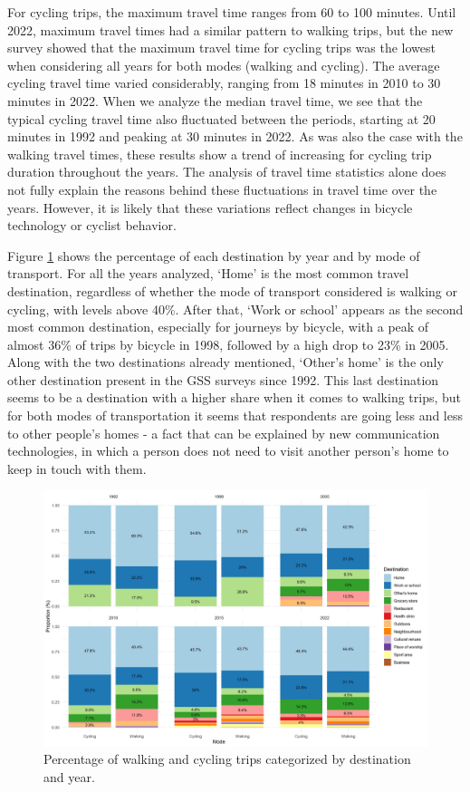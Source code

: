 \documentclass[preprint, 3p,
authoryear]{elsarticle} %
\begin{document}
For cycling trips, the maximum travel time ranges from 60 to 100
minutes. Until 2022, maximum travel times had a similar pattern to
walking trips, but the new survey showed that the maximum travel time
for cycling trips was the lowest when considering all years for both
modes (walking and cycling). The average cycling travel time varied
considerably, ranging from 18 minutes in 2010 to 30 minutes in 2022.
When we analyze the median travel time, we see that the typical cycling
travel time also fluctuated between the periods, starting at 20 minutes
in 1992 and peaking at 30 minutes in 2022. As was also the case with the
walking travel times, these results show a trend of increasing for
cycling trip duration throughout the years. The analysis of travel time
statistics alone does not fully explain the reasons behind these
fluctuations in travel time over the years. However, it is likely that
these variations reflect changes in bicycle technology or cyclist
behavior.

Figure \ref{fig:figure-destmodeyearperc} shows the percentage of each
destination by year and by mode of transport. For all the years
analyzed, `Home' is the most common travel destination, regardless of
whether the mode of transport considered is walking or cycling, with
levels above 40\%. After that, `Work or school' appears as the second
most common destination, especially for journeys by bicycle, with a peak
of almost 36\% of trips by bicycle in 1998, followed by a high drop to
23\% in 2005. Along with the two destinations already mentioned,
`Other's home' is the only other destination present in the GSS surveys
since 1992. This last destination seems to be a destination with a
higher share when it comes to walking trips, but for both modes of
transportation it seems that respondents are going less and less to
other people's homes - a fact that can be explained by new communication
technologies, in which a person does not need to visit another person's
home to keep in touch with them.

\begin{figure}
\includegraphics[width=1\linewidth]{figures/destination_percentual} \caption{Percentage of walking and cycling trips categorized by destination and year.}\label{fig:figure-destmodeyearperc}
\end{figure}
\end{document}
